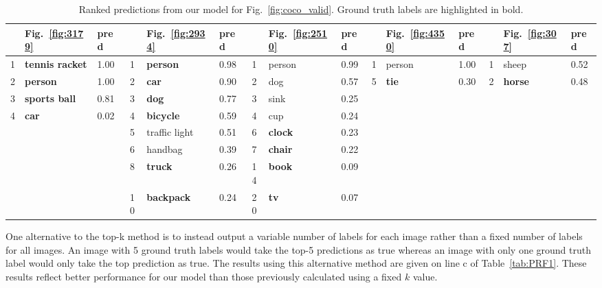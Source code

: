 \documentclass[12pt,journal,compsoc]{IEEEtran}
\begin{document}
\begin{table}
\caption{Ranked predictions from our model for Fig.~\ref{fig:coco_valid}. Ground truth labels are highlighted in bold.}
\label{tab:coco_valid}
\centering
\begin{tabular}{cll|cll|cll|cll|cll}
\toprule
 & Fig.~\ref{fig:3179} & pred &  & Fig.~\ref{fig:2934} & pred     &  & Fig.~\ref{fig:2510} & pred     &  & Fig.~\ref{fig:4350} & pred &  & Fig.~\ref{fig:307} & pred \\
\midrule
1 & \textbf{tennis racket} & 1.00 & 1  &   \textbf{person} & 0.98 & 1  & person & 0.99 & 1 & person & 1.00 & 1 &          sheep & 0.52 \\
2 &        \textbf{person} & 1.00 & 2  &      \textbf{car} & 0.90 & 2  &    dog & 0.57 & 5 & \textbf{tie} & 0.30 & 2 & \textbf{horse} & 0.48 \\
3 &   \textbf{sports ball} & 0.81 & 3  &      \textbf{dog} & 0.77 & 3  &           sink & 0.25 & & & & & \\
4 &           \textbf{car} & 0.02 & 4  &  \textbf{bicycle} & 0.59 & 4  &            cup & 0.24 & & & & & \\
  &                        &      & 5  &     traffic light & 0.51 & 6  & \textbf{clock} & 0.23 & & & & & \\
  &                        &      & 6  &           handbag & 0.39 & 7  & \textbf{chair} & 0.22 & & & & & \\
  &                        &      & 8  &    \textbf{truck} & 0.26 & 14 &  \textbf{book} & 0.09 & & & & & \\
  &                        &      & 10 & \textbf{backpack} & 0.24 & 20 &    \textbf{tv} & 0.07 & & & & & \\
\bottomrule
\end{tabular}
\end{table}

One alternative to the top-k method is to instead output a variable number of labels for each image rather than a fixed number of labels for all images. An image with 5 ground truth labels would take the top-5 predictions as true whereas an image with only one ground truth label would only take the top prediction as true.  The results using this alternative method are given on line c of Table~\ref{tab:PRF1}. These results reflect better performance for our model than those previously calculated using a fixed $k$ value.
\end{document}
